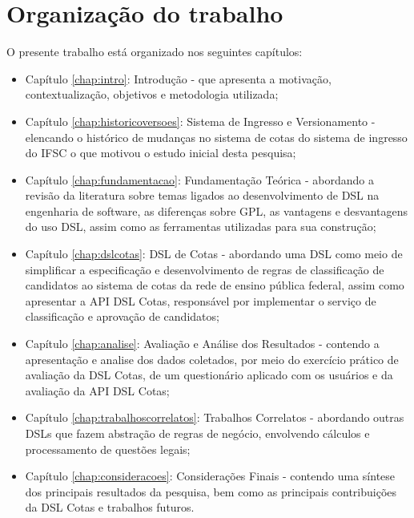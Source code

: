 \section{Organização do trabalho}
\label{organizacao}

O presente trabalho está organizado nos seguintes capítulos:

\begin{itemize}
    \item Capítulo \ref{chap:intro}: Introdução - que apresenta a motivação, contextualização, objetivos e metodologia utilizada;
    \item Capítulo \ref{chap:historicoversoes}: Sistema de Ingresso e Versionamento - elencando o histórico de mudanças no sistema de cotas do sistema de ingresso do \gls{IFSC} o que motivou o estudo inicial desta pesquisa;
    \item Capítulo \ref{chap:fundamentacao}: Fundamentação Teórica - abordando a revisão da literatura sobre temas ligados ao desenvolvimento de \gls{DSL} na engenharia de software, as diferenças sobre \gls{GPL}, as vantagens e desvantagens do uso  \gls{DSL}, assim como as ferramentas utilizadas para sua construção;
    \item Capítulo \ref{chap:dslcotas}: DSL de Cotas - abordando uma \gls{DSL} como meio de simplificar a especificação e desenvolvimento de regras de classificação de candidatos ao sistema de cotas da rede de ensino pública federal, assim como apresentar a \gls{API} DSL Cotas, responsável por implementar o serviço de classificação e aprovação de candidatos;
    \item Capítulo \ref{chap:analise}: Avaliação e Análise dos Resultados - contendo a apresentação e analise dos dados coletados, por meio do exercício prático de avaliação da DSL Cotas, de um questionário aplicado com os usuários e da avaliação da
    \gls{API} DSL Cotas;
     \item Capítulo \ref{chap:trabalhoscorrelatos}: Trabalhos Correlatos - abordando outras \gls{DSL}s que fazem abstração de regras de negócio, envolvendo cálculos e processamento de questões legais;  
    \item Capítulo \ref{chap:consideracoes}: Considerações Finais - contendo uma síntese dos principais resultados da pesquisa, bem como as principais contribuições da DSL Cotas e trabalhos futuros.
\end{itemize}
